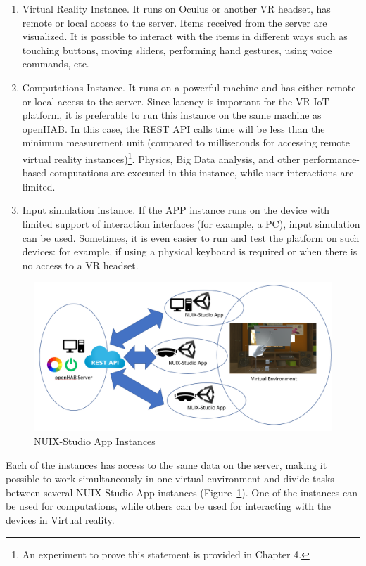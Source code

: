 \begin{enumerate}
    \item Virtual Reality Instance. It runs on Oculus or another VR headset, has remote or local access to the server. Items received from the server are visualized. It is possible to interact with the items in different ways such as touching buttons, moving sliders, performing hand gestures, using voice commands, etc. 
    \item Computations Instance. It runs on a powerful machine and has either remote or local access to the server. Since latency is important for the VR-IoT platform, it is preferable to run this instance on the same machine as openHAB. In this case, the REST API calls time will be less than the minimum measurement unit (compared to milliseconds for accessing remote virtual reality instances)\footnote{An experiment to prove this statement is provided in Chapter 4.}. Physics, Big Data analysis, and other performance-based computations are executed in this instance, while user interactions are limited.
    \item Input simulation instance. If the APP instance runs on the device with limited support of interaction interfaces (for example, a PC), input simulation can be used. Sometimes, it is even easier to run and test the platform on such devices: for example, if using a physical keyboard is required or when there is no access to a VR headset.
\end{enumerate}

\begin{figure}
  \centering
  \includegraphics[width=0.9\linewidth]{figures/AppInstances.png}
  \caption{NUIX-Studio App Instances}
  \label{fig:AppInstances-figure}
\end{figure}

Each of the instances has access to the same data on the server, making it possible to work simultaneously in one virtual environment and divide tasks between several NUIX-Studio App instances (Figure~\ref{fig:AppInstances-figure}). One of the instances can be used for computations, while others can be used for interacting with the devices in Virtual reality.

